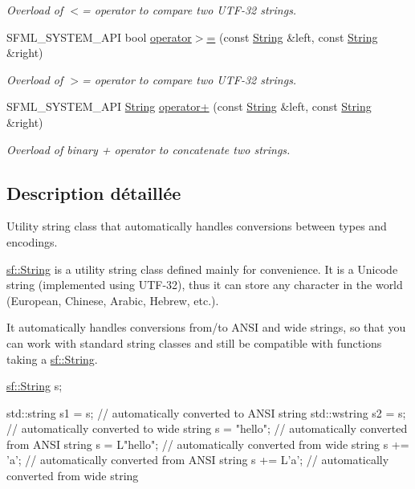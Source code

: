 \begin{DoxyCompactItemize}
\begin{DoxyCompactList}\small\item\em Overload of $<$= operator to compare two U\+T\+F-\/32 strings. \end{DoxyCompactList}\item 
S\+F\+M\+L\+\_\+\+S\+Y\+S\+T\+E\+M\+\_\+\+A\+PI bool \hyperlink{classsf_1_1String_a8d2979d7829d6616330a768956f251e1}{operator$>$=} (const \hyperlink{classsf_1_1String}{String} \&left, const \hyperlink{classsf_1_1String}{String} \&right)
\begin{DoxyCompactList}\small\item\em Overload of $>$= operator to compare two U\+T\+F-\/32 strings. \end{DoxyCompactList}\item 
S\+F\+M\+L\+\_\+\+S\+Y\+S\+T\+E\+M\+\_\+\+A\+PI \hyperlink{classsf_1_1String}{String} \hyperlink{classsf_1_1String_a55ef2bf7dc6b295ef7127b0bc1e58760}{operator+} (const \hyperlink{classsf_1_1String}{String} \&left, const \hyperlink{classsf_1_1String}{String} \&right)
\begin{DoxyCompactList}\small\item\em Overload of binary + operator to concatenate two strings. \end{DoxyCompactList}\end{DoxyCompactItemize}


\subsection{Description détaillée}
Utility string class that automatically handles conversions between types and encodings. 

\hyperlink{classsf_1_1String}{sf\+::\+String} is a utility string class defined mainly for convenience. It is a Unicode string (implemented using U\+T\+F-\/32), thus it can store any character in the world (European, Chinese, Arabic, Hebrew, etc.).

It automatically handles conversions from/to A\+N\+SI and wide strings, so that you can work with standard string classes and still be compatible with functions taking a \hyperlink{classsf_1_1String}{sf\+::\+String}.


\begin{DoxyCode}
\hyperlink{classsf_1_1String}{sf::String} s;

std::string s1 = s;  \textcolor{comment}{// automatically converted to ANSI string}
std::wstring s2 = s; \textcolor{comment}{// automatically converted to wide string}
s = \textcolor{stringliteral}{"hello"};         \textcolor{comment}{// automatically converted from ANSI string}
s = L\textcolor{stringliteral}{"hello"};        \textcolor{comment}{// automatically converted from wide string}
s += \textcolor{charliteral}{'a'};            \textcolor{comment}{// automatically converted from ANSI string}
s += L\textcolor{charliteral}{'a'};           \textcolor{comment}{// automatically converted from wide string}
\end{DoxyCode}


